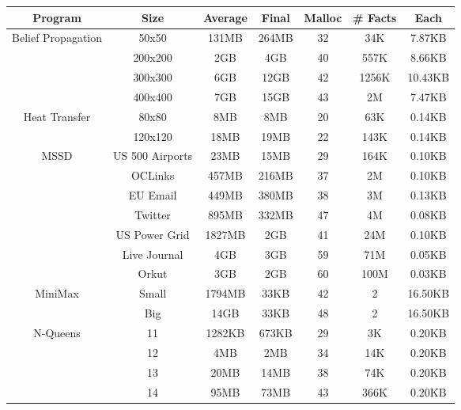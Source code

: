 \begin{tabular}{c | c || c | c | c || c c} \hline
	\textbf{Program} & \textbf{Size} & \textbf{Average} & \textbf{Final} & \textbf{Malloc} & \textbf{\# Facts} & \textbf{Each} \\ \hline \hline
	\multirow{4}{*}{Belief Propagation}  & 50x50 & 131MB & 264MB & 32 & 34K & 7.87KB \\
		 & 200x200 & 2GB & 4GB & 40 & 557K & 8.66KB \\
		 & 300x300 & 6GB & 12GB & 42 & 1256K & 10.43KB \\
		 & 400x400 & 7GB & 15GB & 43 & 2M & 7.47KB \\
	\hline
	\multirow{2}{*}{Heat Transfer}  & 80x80 & 8MB & 8MB & 20 & 63K & 0.14KB \\
		 & 120x120 & 18MB & 19MB & 22 & 143K & 0.14KB \\
	\hline
	\multirow{7}{*}{MSSD}  & US 500 Airports & 23MB & 15MB & 29 & 164K & 0.10KB \\
		 & OCLinks & 457MB & 216MB & 37 & 2M & 0.10KB \\
		 & EU Email & 449MB & 380MB & 38 & 3M & 0.13KB \\
		 & Twitter & 895MB & 332MB & 47 & 4M & 0.08KB \\
		 & US Power Grid & 1827MB & 2GB & 41 & 24M & 0.10KB \\
		 & Live Journal & 4GB & 3GB & 59 & 71M & 0.05KB \\
		 & Orkut & 3GB & 2GB & 60 & 100M & 0.03KB \\
	\hline
	\multirow{2}{*}{MiniMax}  & Small & 1794MB & 33KB & 42 & 2 & 16.50KB \\
		 & Big & 14GB & 33KB & 48 & 2 & 16.50KB \\
	\hline
	\multirow{4}{*}{N-Queens}  & 11 & 1282KB & 673KB & 29 & 3K & 0.20KB \\
		 & 12 & 4MB & 2MB & 34 & 14K & 0.20KB \\
		 & 13 & 20MB & 14MB & 38 & 74K & 0.20KB \\
		 & 14 & 95MB & 73MB & 43 & 366K & 0.20KB \\
	\hline
\end{tabular}
